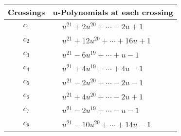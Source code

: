 \documentclass[1p]{elsarticle_modified}
\theoremstyle{definition}
\begin{document}
\begin{tabular}{m{50pt}|m{274pt}}
Crossings & \hspace{64pt}u-Polynomials at each crossing \\
\hline $$\begin{aligned}c_{1}\end{aligned}$$&$\begin{aligned}
&u^{21}+2 u^{20}+\cdots-2 u+1
\end{aligned}$\\
\hline $$\begin{aligned}c_{2}\end{aligned}$$&$\begin{aligned}
&u^{21}+12 u^{20}+\cdots+16 u+1
\end{aligned}$\\
\hline $$\begin{aligned}c_{3}\end{aligned}$$&$\begin{aligned}
&u^{21}-6 u^{19}+\cdots+u-1
\end{aligned}$\\
\hline $$\begin{aligned}c_{4}\end{aligned}$$&$\begin{aligned}
&u^{21}+4 u^{19}+\cdots+4 u-1
\end{aligned}$\\
\hline $$\begin{aligned}c_{5}\end{aligned}$$&$\begin{aligned}
&u^{21}-2 u^{20}+\cdots-2 u-1
\end{aligned}$\\
\hline $$\begin{aligned}c_{6}\end{aligned}$$&$\begin{aligned}
&u^{21}+4 u^{20}+\cdots-2 u+1
\end{aligned}$\\
\hline $$\begin{aligned}c_{7}\end{aligned}$$&$\begin{aligned}
&u^{21}-2 u^{19}+\cdots- u-1
\end{aligned}$\\
\hline $$\begin{aligned}c_{8}\end{aligned}$$&$\begin{aligned}
&u^{21}-10 u^{20}+\cdots+14 u-1
\end{aligned}$\\

\end{tabular}
\end{document}
